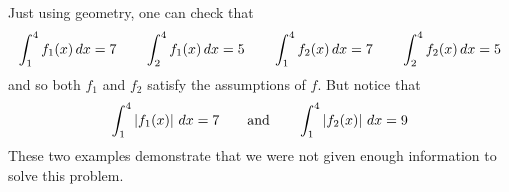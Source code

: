\documentclass[handout,nooutcomes]{ximera}
\begin{document}
\begin{problem}
\begin{enumerate}
\begin{freeResponse}
	Just using geometry, one can check that
	$$ \int_1^4 f_1(x)\,d x = 7	\qquad	\int_2^4 f_1(x)\,d x = 5	\qquad	\int_1^4 f_2(x)\,d x = 7	\qquad	\int_2^4 f_2(x)\,d x = 5 $$
	and so both $f_1$ and $f_2$ satisfy the assumptions of $f$.  But notice that
	$$\int_1^4 \left| f_1(x) \right| \,d x = 7	\qquad	\text{and}		\qquad	\int_1^4 \left| f_2(x) \right| \,d x = 9  $$
	These two examples demonstrate that we were not given enough information to solve this problem.
		
		\end{freeResponse}
		
		
		
	\end{enumerate}
		
			
			
		
\end{problem}


















	
	
	
	
	
	
	
	
	

	










								
				
				
	
\end{document}
